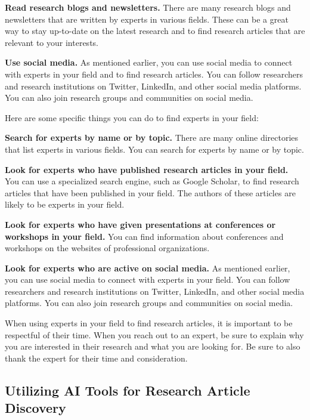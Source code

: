 \documentclass[
]{book}
\begin{document}
\textbf{Read research blogs and newsletters.} There are many research blogs and newsletters that are written by experts in various fields. These can be a great way to stay up-to-date on the latest research and to find research articles that are relevant to your interests.

\textbf{Use social media.} As mentioned earlier, you can use social media to connect with experts in your field and to find research articles. You can follow researchers and research institutions on Twitter, LinkedIn, and other social media platforms. You can also join research groups and communities on social media.

Here are some specific things you can do to find experts in your field:

\textbf{Search for experts by name or by topic.} There are many online directories that list experts in various fields. You can search for experts by name or by topic.

\textbf{Look for experts who have published research articles in your field.} You can use a specialized search engine, such as Google Scholar, to find research articles that have been published in your field. The authors of these articles are likely to be experts in your field.

\textbf{Look for experts who have given presentations at conferences or workshops in your field.} You can find information about conferences and workshops on the websites of professional organizations.

\textbf{Look for experts who are active on social media.} As mentioned earlier, you can use social media to connect with experts in your field. You can follow researchers and research institutions on Twitter, LinkedIn, and other social media platforms. You can also join research groups and communities on social media.

When using experts in your field to find research articles, it is important to be respectful of their time. When you reach out to an expert, be sure to explain why you are interested in their research and what you are looking for. Be sure to also thank the expert for their time and consideration.

\hypertarget{utilizing-ai-tools-for-research-article-discovery}{%
\subsection*{Utilizing AI Tools for Research Article Discovery}\label{utilizing-ai-tools-for-research-article-discovery}}
\end{document}
